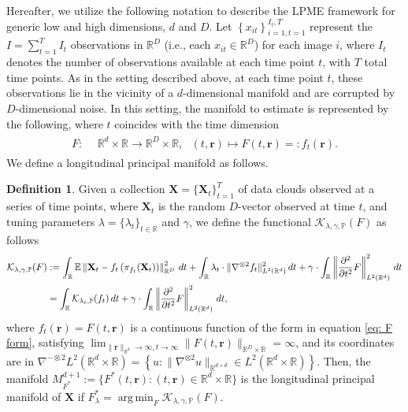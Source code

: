 \documentclass[12pt]{article}
\DeclareMathOperator*{\argmin}{arg\,min}
\theoremstyle{definition}
\newtheorem{definition}{Definition}
\begin{document}
Hereafter, we utilize the following notation to describe the LPME framework for generic low and high dimensions, $d$ and $D$. Let $\left\{x_{it}\right\}_{i=1, t=1}^{I_t, T}$ represent the $I = \sum_{t=1}^{T}I_t$ observations in $\mathbb{R}^D$ (i.e., each $x_{it}\in\mathbb{R}^D$) for each image $i$, where $I_t$ denotes the number of observations available at each time point $t$, with $T$ total time points. As in the setting described above, at each time point $t$, these observations lie in the vicinity of a $d$-dimensional manifold and are corrupted by $D$-dimensional noise. In this setting, the manifold to estimate is represented by the following, where $t$ coincides with the time dimension
\begin{align}\label{eq: F form}
    \begin{aligned}
        F:\ \ & \mathbb{R}^d\times\mathbb{R} \rightarrow \mathbb{R}^D\times\mathbb{R},\ \ \  (t,\mathbf{r})\mapsto F(t,\mathbf{r})=:f_t(\mathbf{r}).
    \end{aligned}
\end{align}
We define a longitudinal principal manifold as follows.
\begin{definition}
  \label{def:lpme} Given a collection $\mathbf{X} = \{ \mathbf{X}_t \}_{t=1}^T$ of data clouds observed at a series of time points, where $\mathbf{X}_t$ is the random  $D$-vector observed at time $t$, and tuning parameters $\lambda=\{\lambda_t\}_{t\in\mathbb{R}}$ and $\gamma$, we define the functional $\mathcal{K}_{\lambda, \gamma, \mathbb{P}}(F)$ as follows
\begin{align}\label{eq:newKappa}
      \notag\mathcal{K}_{\lambda, \gamma, \mathbb{P}}(F) &:= \int_\mathbb{R} \mathbb{E}\left\|\mathbf{X}_t - f_t\left(\pi_{f_t}(\mathbf{X}_t)\right)\right\|_{\mathbb{R}^{D}}^2 \, dt + \int_\mathbb{R} \lambda_t \cdot\|\nabla^{\otimes 2}f_t\|_{L^2(\mathbb{R}^{d})}^2 \, dt + \gamma\cdot \int_{\mathbb{R}}\left\|\frac{\partial^2}{\partial t^2}F\right\|_{L^2(\mathbb{R}^d)}^2 \, dt \\
  &= \int_{\mathbb{R}}\mathcal{K}_{\lambda_t, \mathbb{P}}(f_t) \, dt + \gamma \cdot \int_{\mathbb{R}}\left\|\frac{\partial^2}{\partial t^2}F\right\|_{L^2(\mathbb{R}^d)}^2 \, dt,
\end{align}
\sloppy where $f_t(\mathbf{r})=F(t,\mathbf{r})$ is a continuous function of the form in equation \eqref{eq: F form}, satisfying $\lim_{\|\mathbf{r}\|_{\mathbb{R}^{d}} \to \infty, t \to \infty}\|F(t,\mathbf{r})\|_{\mathbb{R}^{D}\times\mathbb{R}} = \infty$, and its coordinates are in $\nabla^{-\otimes 2}L^2(\mathbb{R}^{d}\times\mathbb{R}) = \left\{u: \|\nabla^{\otimes 2} u\|_{\mathbb{R}^{d \times d}} \in L^2(\mathbb{R}^{d}\times\mathbb{R})\right\}$. Then, the manifold $M_{F^{*}}^{d+1}:=\{F^*(t,\mathbf{r}): (t,\mathbf{r})\in \mathbb{R}^d\times\mathbb{R}\}$ is the longitudinal principal manifold of $\mathbf{X}$ if $F_{\lambda}^{*} = \argmin_{F}\mathcal{K}_{\lambda, \gamma, \mathbb{P}}(F)$.
\end{definition}
\end{document}
